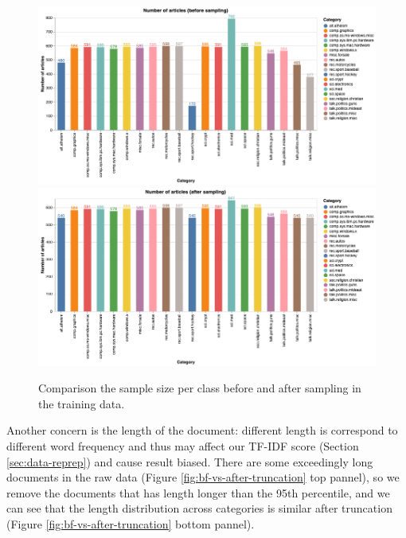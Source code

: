 \documentclass[11pt]{article}
\theoremstyle{remark}
\begin{document}
\begin{figure}[t]
 \begin{center}
	\includegraphics[width=18cm]{figs/figure1_bf_sampling.png} \\
	\includegraphics[width=18cm]{figs/figure1_after_sampling.png}
  \end{center}
  \caption{Comparison the sample size per class before and after sampling in the training data.}
  \label{fig:bf-vs-after-sampling}
 \end{figure}

Another concern is the length of the document: different length is correspond to different word frequency and thus may affect our TF-IDF score (Section \ref{sec:data-reprep}) and cause result biased.
There are some exceedingly long documents in the raw data (Figure \ref{fig:bf-vs-after-truncation} top pannel), so we remove the documents that has length longer than the 95th percentile, and we can see that the length distribution across categories is similar after truncation (Figure \ref{fig:bf-vs-after-truncation} bottom pannel). 
\end{document}
